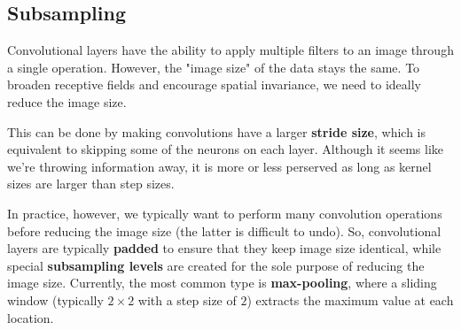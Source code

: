 \documentclass{article}
\begin{document}
\subsection{Subsampling}
Convolutional layers have the ability to apply multiple filters to an image through a single operation. However, the "image size" of the data stays the same. To broaden receptive fields and encourage spatial invariance, we need to ideally reduce the image size.

This can be done by making convolutions have a larger \textbf{stride size}, which is equivalent to skipping some of the neurons on each layer. Although it seems like we're throwing information away, it is more or less perserved as long as kernel sizes are larger than step sizes.

In practice, however, we typically want to perform many convolution operations before reducing the image size (the latter is difficult to undo). So, convolutional layers are typically \textbf{padded} to ensure that they keep image size identical, while special \textbf{subsampling levels} are created for the sole purpose of reducing the image size. Currently, the most common type is \textbf{max-pooling}, where a sliding window (typically $2\times2$ with a step size of $2$) extracts the maximum value at each location.
\end{document}
